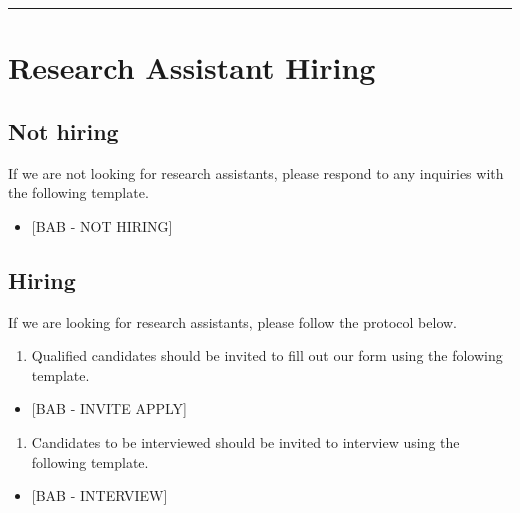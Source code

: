 \documentclass[
]{book}
\providecommand{\tightlist}{%
  \setlength{\itemsep}{0pt}\setlength{\parskip}{0pt}}
\begin{document}
\begin{center}\rule{0.5\linewidth}{0.5pt}\end{center}

\hypertarget{research-assistant-hiring}{%
\section{Research Assistant Hiring}\label{research-assistant-hiring}}

\hypertarget{not-hiring}{%
\subsection{Not hiring}\label{not-hiring}}

If we are not looking for research assistants, please respond to any inquiries with the following template.

\begin{itemize}
\tightlist
\item
  {[}BAB - NOT HIRING{]}
\end{itemize}

\hypertarget{hiring}{%
\subsection{Hiring}\label{hiring}}

If we are looking for research assistants, please follow the protocol below.

\begin{enumerate}
\def\labelenumi{\arabic{enumi}.}
\tightlist
\item
  Qualified candidates should be invited to fill out our form using the folowing template.
\end{enumerate}

\begin{itemize}
\tightlist
\item
  {[}BAB - INVITE APPLY{]}
\end{itemize}

\begin{enumerate}
\def\labelenumi{\arabic{enumi}.}
\setcounter{enumi}{1}
\tightlist
\item
  Candidates to be interviewed should be invited to interview using the following template.
\end{enumerate}

\begin{itemize}
\tightlist
\item
  {[}BAB - INTERVIEW{]}
\end{itemize}
\end{document}
